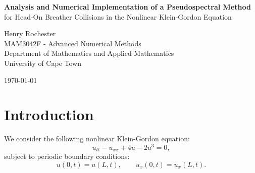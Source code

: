 \documentclass[12pt]{article}
\begin{document}
\begin{titlepage}
\centering

\vspace*{1.5cm}

{\LARGE \textbf{Analysis and Numerical Implementation of a Pseudospectral Method}}\\[0.3cm]

{\large for Head-On Breather Collisions in the Nonlinear Klein-Gordon Equation}

\vspace{1.2cm}

{\large Henry Rochester}\\[0.5cm]

{\large
MAM3042F - Advanced Numerical Methods \\[0.3cm]
Department of Mathematics and Applied Mathematics \\ 
University of Cape Town
}

\vspace{1cm}

{\large \today}

\begin{abstract}
In this project, we implement a pseudospectral method to simulate breather solutions of the nonlinear Klein-Gordon equation. We first verify the method on a single breather, which remains localised in space while oscillating in time. We then study head-on collisions between two breathers for different half-separation distances \(d\). The simulations show that the strongest interaction occurs when the breathers are initially superimposed, while for larger values of \(d\), the collision amplitude decreases and then stabilises. Overall, the results show that the initial separation distance affects the strength of the collision most significantly when the breathers begin close together.
\end{abstract}

\end{titlepage}

\section*{Introduction}

We consider the following nonlinear Klein-Gordon equation:
\[
u_{tt} - u_{xx} + 4u - 2u^3 = 0,
\]
subject to periodic boundary conditions:
\[
u(0,t) = u(L,t), 
\qquad 
u_x(0,t) = u_x(L,t).
\]
\end{document}
